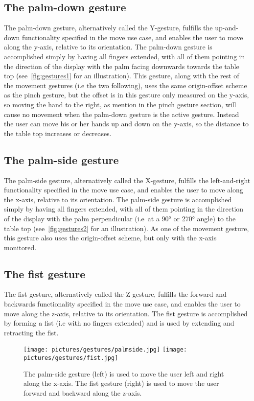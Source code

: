 \subsection{The palm-down gesture}
\label{sec:palm_down_design}
The palm-down gesture, alternatively called the Y-gesture, fulfills the up-and-down functionality specified in the move use case, and enables the user to 
move along the y-axis, relative to its orientation. The palm-down gesture is accomplished simply by having all fingers extended, with all of them pointing in
the direction of the display with the palm facing downwards towards the table top (see~\vref{fig:gestures1} for an illustration). This gesture, along with the rest of the 
movement gestures (i.e the two following), uses the same origin-offset scheme as the pinch gesture, but the offset is in this gesture only measured on the y-axis, 
so moving the hand to the 
right, as mention in the pinch gesture section, will cause no movement when the palm-down gesture is the active gesture. 
Instead the user can move his or her hands up and down on the y-axis, so the distance to the table top increases or decreases.  

\subsection{The palm-side gesture}
The palm-side gesture, alternatively called the X-gesture, fulfills the left-and-right functionality specified in the move use case, and enables the user to 
move along the x-axis, relative to its orientation. The palm-side gesture is accomplished simply by having all fingers extended, with all of them pointing in
the direction of the display with the palm perpendicular (i.e~at a 90° or 270° angle) to the table top (see~\vref{fig:gestures2} for an illustration). 
As one of the movement gesture, this gesture also uses the origin-offset scheme, but only with the x-axis monitored.

\subsection{The fist gesture}
The fist gesture, alternatively called the Z-gesture, fulfills the forward-and-backwards functionality specified in the move use case, and enables the user to 
move along the z-axis, relative to its orientation. The fist gesture is accomplished by forming a fist (i.e with no fingers extended)
and is used by extending and retracting the fist. 

\begin{figure}%
	\texttt{[image: pictures/gestures/palmside.jpg]}
    \texttt{[image: pictures/gestures/fist.jpg]}
	\caption[The palm-side and fist gestures]{The palm-side gesture (left) is used to move the user left and right along the x-axis. 
             The fist gesture (right) is used to move the user forward and backward along the z-axis.}
	\label{fig:gestures2}
\end{figure} 

